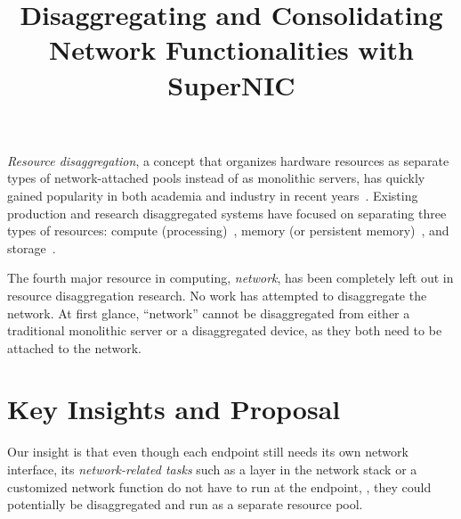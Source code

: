 %

\title{Disaggregating and Consolidating Network Functionalities with SuperNIC}
\date{}
\maketitle
\thispagestyle{empty}

\fi

{\em Resource disaggregation}, a concept that organizes hardware resources as separate types of network-attached pools instead of as monolithic servers, has quickly gained popularity in both academia and industry in recent years~\cite{Shan18-OSDI,HP-TheMachine,IntelRackScale,FireBox-FASTKeynote,Tsai20-ATC,Nitu18-EUROSYS,DDC-hotcloud20,Ali-SinglesDay}.
Existing production and research disaggregated systems have focused on separating three types of resources: compute (processing)~\cite{Shan18-OSDI,any-gpu-disagg-work}, memory (or persistent memory)~\cite{Shan18-OSDI,HP-TheMachine,Lim09-disaggregate,Aguilera-FarMemory,Tsai20-ATC}, and storage~\cite{cao2018polarfs,SnowFlake-NSDI20}.

The fourth major resource in computing, \textit{network}, has been completely left out in resource disaggregation research.
No work has attempted to disaggregate the network.
At first glance, ``network'' cannot be disaggregated from either a traditional monolithic server or a disaggregated device, as they both need to be attached to the network.

\section{Key Insights and Proposal}
Our insight is that even though each endpoint still needs its own network interface, its \emph{network-related tasks} such as a layer in the network stack or a customized network function do not have to run at the endpoint, \ie, they could potentially be disaggregated and run as a separate resource pool.  

